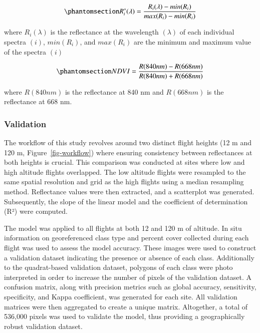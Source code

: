 \documentclass[
  number]{elsarticle}
\begin{document}
\begin{equation}\phantomsection\label{eq-std}{
R_{i}^{*}(\lambda) = \frac{R_{i}(\lambda) - min(R_{i})}{max(R_{i})- min(R_{i})}
}\end{equation}

where \(R_{i}(\lambda)\) is the reflectance at the wavelength
\((\lambda)\) of each individual spectra \((i)\), \(min(R_{i})\), and
\(max(R_{i})\) are the minimum and maximum value of the spectra \((i)\)

\begin{equation}\phantomsection\label{eq-ndvi}{
NDVI = \frac{R(840nm)-R(668nm)}{R(840nm)+R(668nm)}
}\end{equation}

where \(R(840nm)\) is the reflectance at 840 nm and \(R(668nm)\) is the
reflectance at 668 nm.

\subsubsection{Validation}\label{validation}

The workflow of this study revolves around two distinct flight heights
(12 m and 120 m, Figure~\ref{fig-workflow}) where ensuring consistency
between reflectances at both heights is crucial. This comparison was
conducted at sites where low and high altitude flights overlapped. The
low altitude flights were resampled to the same spatial resolution and
grid as the high flights using a median resampling method. Reflectance
values were then extracted, and a scatterplot was generated.
Subsequently, the slope of the linear model and the coefficient of
determination (R²) were computed.

The model was applied to all flights at both 12 and 120 m of altitude.
In situ information on georeferenced class type and percent cover
collected during each flight was used to assess the model accuracy.
These images were used to construct a validation dataset indicating the
presence or absence of each class. Additionally to the quadrat-based
validation dataset, polygons of each class were photo interpreted in
order to increase the number of pixels of the validation dataset. A
confusion matrix, along with precision metrics such as global accuracy,
sensitivity, specificity, and Kappa coefficient, was generated for each
site. All validation matrices were then aggregated to create a unique
matrix. Altogether, a total of 536,000 pixels was used to validate the
model, thus providing a geographically robust validation dataset.
\end{document}
